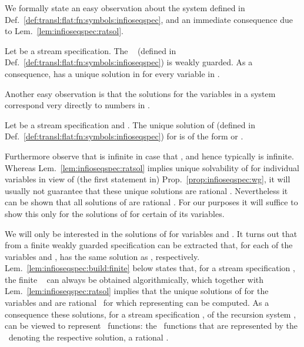 We formally state an easy observation about the system 
defined in Def.~\ref{def:transl:flat:fn:symbols:infioseqspec},
and an immediate consequence due to Lem.~\ref{lem:infioseqspec:ratsol}.


\begin{proposition}\label{prop:infioseqspec:wg}
Let  be a stream specification. 
  The \infioseqspec~ (defined in
  Def.~\ref{def:transl:flat:fn:symbols:infioseqspec}) is weakly guarded.
  As a consequence, 
   has a unique solution in 
  for every variable  in .
\end{proposition}


Another easy observation is that the solutions for the 
variables  in a system 
correspond very directly to numbers in .


\begin{proposition}\label{prop:infioseqspec:argnone}
Let  be a stream specification and .
  The unique solution of  (defined in
  Def.~\ref{def:transl:flat:fn:symbols:infioseqspec})
  for  is of the form
   or .
\end{proposition}

Furthermore observe that  is infinite in case that
, and hence typically is infinite.
Whereas Lem.~\ref{lem:infioseqspec:ratsol} implies unique solvability
of  for individual variables
in view of (the first statement in) Prop.~\ref{prop:infioseqspec:wg}, 
it will usually not
guarantee that these unique solutions are rational .
Nevertheless it can be shown that all solutions
of  are rational .
For our purposes it will suffice to show this only for the solutions 
of  for certain of its variables.

We will only be interested in the solutions of 
for variables  and .
It turns out that from 
a finite weakly guarded specification  can be extracted
that, 
for each of the variables  and ,
has the same solution as , respectively.
Lem.~\ref{lem:infioseqspec:build:finite} below states that,
for a stream specification , the finite 
\infioseqspec~ can always be obtained algorithmically,
which together with Lem.~\ref{lem:infioseqspec:ratsol} implies that
the unique solutions of  for the
variables  and 
are rational \
for which representing  can be computed. 
As a consequence these solutions, for a stream specification ,
of the recursion system , can be viewed to represent \pein~functions: 
the \pein~functions that are represented by the \ioterm\
denoting the respective solution, a rational \ioseq. 



